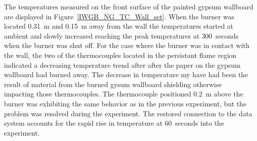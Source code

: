 \documentclass[twoside]{uocthesis}
\begin{document}
The temperatures measured on the front surface of the painted gypsum wallboard are displayed in Figure~\ref{IWGB_NG_TC_Wall_set}.  When the burner was located 0.31~m and 0.15~m away from the wall the temperatures started at ambient and slowly increased  reaching the peak temperatures at 300~seconds when the burner was shut off.  For the case where the burner was in contact with the wall, the two of the thermocouples located in the persistant flame region indicated a decreasing temperature trend after after the paper on the gypsum wallboard had burned away.  The decrease in temperature my have had been the result of material from the burned gysum wallboard shielding otherwise impacting those thermocouples. The thermocouple positioned 0.2~m above the burner was exhibiting the same behavior as in the previous experiment, but the problem was resolved during the experiment.  The restored connection to the data system accounts for the rapid rise in temperature at 60~seconds into the experiment.  
\end{document}

